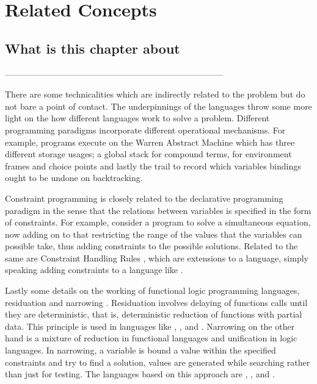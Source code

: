 \documentclass[proposal.tex]{subfiles}
\begin{document}
\chapter{Related Concepts}\label{chap:relatedWork}


\section{What is this chapter about}

-----------------------------------------------------------------------------


There are some technicalities which are indirectly related to the problem but do not bare a point of contact.
The underpinnings of the languages throw some more light on the how different languages work to solve a problem.
Different programming paradigms incorporate different operational mechanisms.
For example,  programs execute on the Warren Abstract Machine \cite{ait1999warren} which has three
different storage usages; a global stack for compound terms, for environment frames and choice points and lastly
the trail to record which variables bindings ought to be undone on backtracking.

Constraint programming \cite{website:constraintprogwiki} is closely related to the declarative programming paradigm
in the sense that the relations between variables is specified in the form of constraints.
For example, consider a program to solve a simultaneous equation, now adding on to that restricting the range of
the values that the variables can possible take, thus adding constraints to the possible solutions.
Related to the same are Constraint Handling Rules \cite{website:chrwiki}, which are extensions to a language,
simply speaking adding constraints to a language like .

Lastly some details on the working of functional logic programming languages, residuation and narrowing
\cite{hanus1995curry,webiste:wikicurry}.
Residuation involves delaying of functions calls until they are deterministic, that is, deterministic reduction of
functions with partial data.
This principle is used in languages like  \cite{lloyd1999programming:escher}, 
\cite{website:life},  \cite{website:nue-prolog} and  \cite{website:oz-mozart}.
Narrowing on the other hand is a mixture of reduction in functional languages and unification in logic languages.
In narrowing, a variable is bound a value within the specified constraints and try to find a solution, values are
generated while searching rather than just for testing.
The languages based on this approach are  \cite{website:alf},  \cite{website:babel},
 \cite{bert1987lpg} and  \cite{website:curry}.
\end{document}
